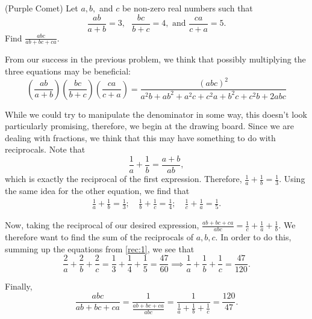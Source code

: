 \begin{exmp}(Purple Comet) Let $a,b,$ and $c$ be non-zero real numbers such that $$\frac{ab}{a+b}=3, \text{ } \frac{bc}{b+c}=4, \text{ and } \frac{ca}{c+a}=5.$$  Find $\displaystyle \frac{abc}{ab+bc+ca}$.  \end{exmp}
\begin{soln}  From our success in the previous problem, we think that possibly multiplying the three equations may be beneficial:  $$\left(\frac{ab}{a+b}\right)\left(\frac{bc}{b+c}\right)\left(\frac{ca}{c+a}\right)=\frac{(abc)^2}{a^2b+ab^2+a^2c+c^2a+b^2c+c^2b+2abc}$$

While we could try to manipulate the denominator in some way, this doesn't look particularly promising, therefore, we begin at the drawing board.  Since we are dealing with fractions, we think that this may have something to do with reciprocals.  Note that $$\frac{1}{a}+\frac{1}{b}=\frac{a+b}{ab},$$ which is exactly the reciprocal of the first expression.  Therefore, $\frac{1}{a}+\frac{1}{b}=\frac13$.  Using the same idea for the other equation, we find that \begin{eqnarray} \label{rec:1} \frac{1}{a}+\frac{1}{b}=\frac13; \quad \frac{1}{b}+\frac{1}{c}=\frac14; \quad \frac{1}{c}+\frac{1}{a}=\frac15. \end{eqnarray}

Now, taking the reciprocal of our desired expression,  $\displaystyle \frac{ab+bc+ca}{abc}=\frac{1}{c}+\frac{1}{a}+\frac{1}{b}.$ \newline We therefore want to find the sum of the reciprocals of $a,b,c$.  In order to do this, summing up the equations from \ref{rec:1}, we see that $$\frac{2}{a}+\frac{2}{b}+\frac{2}{c}=\frac13+\frac14+\frac15=\frac{47}{60}\implies \frac{1}{a}+\frac{1}{b}+\frac{1}{c}=\frac{47}{120}.$$

Finally, $$\frac{abc}{ab+bc+ca}=\frac{1}{\frac{ab+bc+ca}{abc}}=\frac{1}{\frac1a+\frac1b+\frac1c}=\boxed{\frac{120}{47}}.$$




	
	\end{soln}

